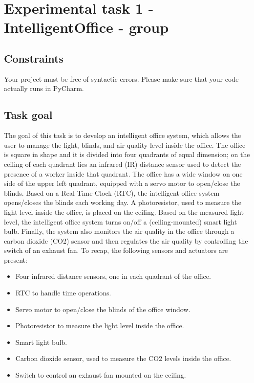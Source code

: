 \chapter{Experimental task 1 - IntelligentOffice - \tdd group}
\label{appendix:A_IntelligengOffice}
\section{Constraints}
Your project must be free of syntactic errors. Please make sure that your code actually runs in PyCharm.

\section{Task goal}
The goal of this task is to develop an intelligent office system, which allows the user to manage the light, blinds, and air quality level inside the office.
The office is square in shape and it is divided into four quadrants of equal dimension; on the ceiling of each quadrant lies an infrared (IR) distance sensor used to detect the presence of a worker inside that quadrant. 
The office has a wide window on one side of the upper left quadrant, equipped with a servo motor to open/close the blinds. 
Based on a Real Time Clock (RTC), the intelligent office system opens/closes the blinds each working day. 
A photoresistor, used to measure the light level inside the office, is placed on the ceiling. Based on the measured light level, the intelligent office system turns on/off a (ceiling-mounted) smart light bulb. 
Finally, the system also monitors the air quality in the office through a carbon dioxide (CO2) sensor and then regulates the air quality by controlling the switch of an exhaust fan.
To recap, the following sensors and actuators are present:

\begin{itemize}
    \item Four infrared distance sensors, one in each quadrant of the office.
    \item RTC to handle time operations.
    \item Servo motor to open/close the blinds of the office window.
    \item Photoresistor to measure the light level inside the office.
    \item Smart light bulb.
    \item Carbon dioxide sensor, used to measure the CO2 levels inside the office.
    \item Switch to control an exhaust fan mounted on the ceiling.
\end{itemize}

